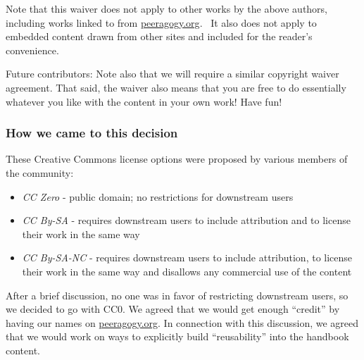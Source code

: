 Note that this waiver does not apply to other works by the above
authors, including works linked to from
\href{http://peeragogy.org}{peeragogy.org}.~ It also does not apply to
embedded content drawn from other sites and included for the reader's
convenience.

Future contributors: Note also that we will require a similar copyright
waiver agreement. That said, the waiver also means that you are free to
do essentially whatever you like with the content in your own work! Have
fun!

\subsubsection{How we came to this decision}

These Creative Commons license options were proposed by various members
of the community:

\begin{itemize}
\itemsep1pt\parskip0pt
\item
  \emph{CC Zero} - public domain; no restrictions for downstream users
\item
  \emph{CC By-SA} - requires downstream users to include attribution and
  to license their work in the same way
\item
  \emph{CC By-SA-NC} - requires downstream users to include attribution,
  to license their work in the same way and disallows any commercial use
  of the content
\end{itemize}

After a brief discussion, no one was in favor of restricting downstream
users, so we decided to go with CC0. We agreed that we would get enough
``credit'' by having our names on
\href{http://peeragogy.org/}{peeragogy.org}. In connection with this
discussion, we agreed that we would work on ways to explicitly build
``reusability'' into the handbook content.
